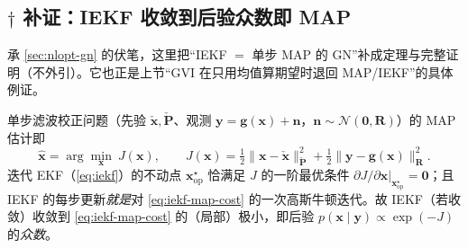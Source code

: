 \subsection{$\dagger$ 补证：IEKF 收敛到后验众数即 MAP}
\label{sec:nlopt-gvi-iekf}

承 \cref{sec:nlopt-gn} 的伏笔，这里把“IEKF $=$ 单步 MAP 的 GN”补成定理与完整证明（不外引）。它也正是上节“GVI 在只用均值算期望时退回 MAP/IEKF”的具体例证。

\begin{theorem}[IEKF 收敛到后验众数（$=$ 单步 MAP）]\label{thm:nlopt-iekf-map}
单步滤波校正问题（先验 $\check{\mathbf{x}},\check{\mathbf{P}}$、观测 $\mathbf{y}=\mathbf{g}(\mathbf{x})+\mathbf{n}$，$\mathbf{n}\sim\mathcal{N}(\mathbf{0},\mathbf{R})$）的 MAP 估计即
\begin{equation}
  \hat{\mathbf{x}}=\arg\min_{\mathbf{x}}\ J(\mathbf{x}),\qquad
  J(\mathbf{x})=\tfrac12\|\mathbf{x}-\check{\mathbf{x}}\|_{\check{\mathbf{P}}}^2+\tfrac12\|\mathbf{y}-\mathbf{g}(\mathbf{x})\|_{\mathbf{R}}^2.
  \label{eq:iekf-map-cost}
\end{equation}
迭代 EKF（\cref{eq:iekf}）的不动点 $\mathbf{x}_{\mathrm{op}}^\star$ 恰满足 $J$ 的一阶最优条件 $\partial J/\partial\mathbf{x}|_{\mathbf{x}_{\mathrm{op}}^\star}=\mathbf{0}$；且 IEKF 的每步更新\emph{就是}对 \cref{eq:iekf-map-cost} 的一次高斯牛顿迭代。故 IEKF（若收敛）收敛到 \cref{eq:iekf-map-cost} 的（局部）极小，即后验 $p(\mathbf{x}\mid\mathbf{y})\propto\exp(-J)$ 的\emph{众数}。
\end{theorem}
